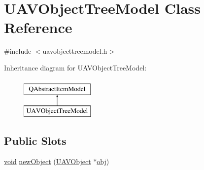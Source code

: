 \hypertarget{class_u_a_v_object_tree_model}{\section{U\-A\-V\-Object\-Tree\-Model Class Reference}
\label{class_u_a_v_object_tree_model}
}


{\ttfamily \#include $<$uavobjecttreemodel.\-h$>$}

Inheritance diagram for U\-A\-V\-Object\-Tree\-Model\-:\begin{figure}[H]
\begin{center}
\leavevmode
\includegraphics[height=2.000000cm]{class_u_a_v_object_tree_model}
\end{center}
\end{figure}
\subsection*{Public Slots}
\begin{DoxyCompactItemize}
\item 
\hyperlink{group___u_a_v_objects_plugin_ga444cf2ff3f0ecbe028adce838d373f5c}{void} \hyperlink{group___u_a_v_object_browser_plugin_gafd9deb057c76e2910dd13055abcbad3e}{new\-Object} (\hyperlink{class_u_a_v_object}{U\-A\-V\-Object} $\ast$\hyperlink{glext_8h_a0c0d4701a6c89f4f7f0640715d27ab26}{obj})
\end{DoxyCompactItemize}
